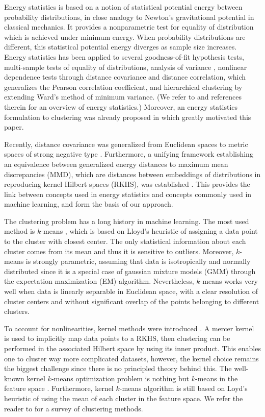 \documentclass[aps,preprint,nofootinbib,floatfix]{revtex4-1}
\begin{document}
Energy statistics \cite{Szkely2013}
is based on a 
notion of statistical potential energy between probability distributions,
in close analogy to Newton's gravitational
potential in classical mechanics. 
It provides a nonparametric test for equality of distribution which
is achieved under minimum energy. When probability distributions
are different, this statistical potential 
energy diverges as sample size increases.
Energy statistics has been applied to several goodness-of-fit 
hypothesis tests, 
multi-sample tests of equality of distributions, analysis of variance
\cite{RizzoVariance}, nonlinear
dependence tests through
distance covariance and distance correlation, which generalizes the Pearson
correlation coefficient, and  
hierarchical clustering \cite{RizzoClustering} by extending Ward's
method of minimum variance. (We refer to \cite{Szkely2013} and 
references therein for an overview of energy statistics.)
Moreover, an energy statistics formulation
to clustering was already proposed in \cite{Kgroups} 
which greatly motivated this paper.

Recently, distance covariance was 
generalized from Euclidean
spaces to metric spaces of strong negative type \cite{Lyons}.
Furthermore, a unifying framework establishing an equivalence
between generalized energy distances to maximum
mean discrepancies (MMD), which are distances between embeddings of
distributions in reproducing kernel Hilbert spaces (RKHS), was
established \cite{Sejdinovic2013}. This provides the 
link between concepts used in energy statistics and concepts
commonly used in machine learning, and form the basis of our approach.

The clustering problem has a long history in machine learning.
The most used method is $k$-means \cite{Lloyd,MacQueen,Forgy}, which
is based on Lloyd's heuristic \cite{Lloyd} of assigning a data point to
the cluster with closest center. The only statistical 
information about each cluster
comes from its mean and thus it is sensitive to outliers. Moreover, $k$-means
is strongly parametric, assuming that data is isotropically and normally
distributed since it is a special case of gaussian mixture models (GMM) 
through the expectation maximization (EM) algorithm. Nevertheless,
$k$-means works very well when data is linearly separable 
in Euclidean space, with a clear resolution of cluster centers and without
significant overlap of the points belonging to different clusters.

To account for nonlinearities, kernel methods were introduced 
\cite{Smola,Girolami}. A mercer kernel \cite{Mercer} is used to implicitly
map data points to a RKHS, then clustering can be performed in the associated
Hilbert
space by using its inner product. This enables one to cluster way more
complicated datasets, however, the kernel choice remains the biggest challenge
since there is no principled theory behind this. The well-known
kernel $k$-means optimization problem is nothing but $k$-means in the
feature space \cite{Girolami}. Furthermore, kernel $k$-means algorithm
\cite{Dhillon2,Dhillon} is still based on Loyd's heuristic \cite{Lloyd} of
using the mean of each cluster in the feature space. 
We refer the reader to \cite{Filippone} for a survey of clustering
methods.
\end{document}
